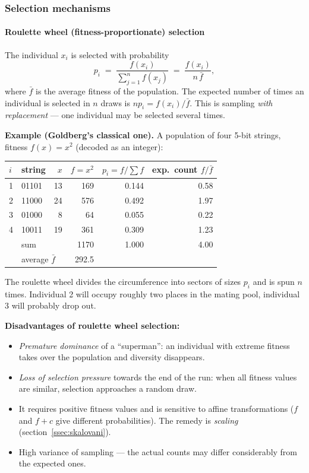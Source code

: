 \documentclass[11pt,a4paper]{article}
\theoremstyle{definition}
\providecommand{\uv}[1]{``#1''}
\begin{document}
\subsubsection{Selection mechanisms}\label{ssec:selekce}

\paragraph{Roulette wheel (fitness-proportionate) selection}

\begin{defbox}
The individual $x_i$ is selected with probability
\[
p_i \;=\; \frac{f(x_i)}{\sum_{j=1}^{n} f(x_j)} \;=\; \frac{f(x_i)}{n\,\bar{f}},
\]
where $\bar f$ is the average fitness of the population. The expected number of
times an individual is selected in $n$ draws is $n p_i = f(x_i)/\bar f$. This is
sampling \emph{with replacement} --- one individual may be selected several
times.
\end{defbox}

\textbf{Example (Goldberg's classical one).}\label{ex:goldberg} A population of
four 5-bit strings, fitness $f(x) = x^2$ (decoded as an integer):

\begin{center}
\begin{tabular}{@{}llrrrr@{}}
\toprule
$i$ & string & $x$ & $f=x^2$ & $p_i = f/\sum f$ & exp.\ count $f/\bar f$ \\
\midrule
1 & 01101 & 13 & 169 & 0.144 & 0.58 \\
2 & 11000 & 24 & 576 & 0.492 & 1.97 \\
3 & 01000 &  8 &  64 & 0.055 & 0.22 \\
4 & 10011 & 19 & 361 & 0.309 & 1.23 \\
\midrule
  & \multicolumn{2}{l}{sum} & 1170 & 1.000 & 4.00 \\
  & \multicolumn{2}{l}{average $\bar f$} & 292.5 & & \\
\bottomrule
\end{tabular}
\end{center}

The roulette wheel divides the circumference into sectors of sizes $p_i$ and is
spun $n$ times. Individual 2 will occupy roughly two places in the mating pool,
individual 3 will probably drop out.

\textbf{Disadvantages of roulette wheel selection:}
\begin{itemize}
\item \emph{Premature dominance} of a \uv{superman}: an individual with extreme
  fitness takes over the population and diversity disappears.
\item \emph{Loss of selection pressure} towards the end of the run: when all
  fitness values are similar, selection approaches a random draw.
\item It requires positive fitness values and is sensitive to affine
  transformations ($f$ and $f + c$ give different probabilities). The remedy is
  \emph{scaling} (section~\ref{ssec:skalovani}).
\item High variance of sampling --- the actual counts may differ considerably
  from the expected ones.
\end{itemize}
\end{document}
